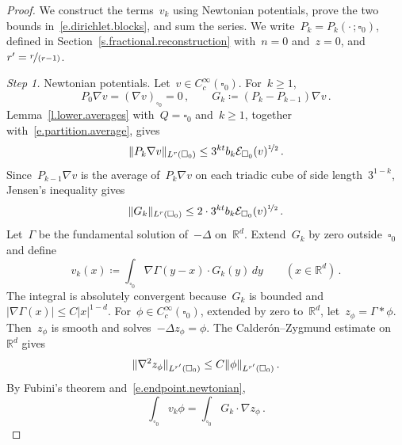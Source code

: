 \documentclass[11pt,letterpaper]{article}
\numberwithin{equation}{section}
\theoremstyle{definition}
\newcommand{\Rd}{\mathbb{R}^d}
\newcommand{\nf}{\nicefrac}
\newcommand{\cu}{\square}
\DeclarePairedDelimiter{\norm}{\lVert}{\rVert}
\newcommand{\Ener}{\mathcal E}
\begin{document}
\begin{proof}
We construct the terms~$v_k$ using Newtonian potentials, prove the two bounds in~\eqref{e.dirichlet.blocks}, and sum the series. We write~$P_k=P_k(\cdot\,;\cu_0)$, defined in Section~\ref{s.fractional.reconstruction} with~$n=0$ and~$z=0$, and~$r'=\nf r{(r-1)}$.

\smallskip

\emph{Step 1.} Newtonian potentials. Let~$v\in C^\infty_c(\cu_0)$. For~$k\geq1$,
\begin{equation*}
	P_0\nabla v=(\nabla v)_{\cu_0}=0\,,\qquad G_k\coloneqq(P_k-P_{k-1})\nabla v\,.
\end{equation*}
Lemma~\ref{l.lower.averages} with~$Q=\cu_0$ and~$k\geq1$, together with~\eqref{e.partition.average}, gives
\begin{equation*}
	\norm{P_k\nabla v}_{L^r(\cu_0)}\leq3^{kt}b_k\Ener_{\cu_0}(v)^{\nf12}\,.
\end{equation*}
Since~$P_{k-1}\nabla v$ is the average of~$P_k\nabla v$ on each triadic cube of side length~$3^{1-k}$, Jensen's inequality gives
\begin{equation}
	\norm{G_k}_{L^r(\cu_0)}\leq2\cdot3^{kt}b_k\Ener_{\cu_0}(v)^{\nf12}\,.
	\label{e.endpoint.gradient.increments}
\end{equation}
Let~$\Gamma$ be the fundamental solution of~$-\Delta$ on~$\Rd$. Extend~$G_k$ by zero outside~$\cu_0$ and define
\begin{equation}
	v_k(x)\coloneqq\int_{\cu_0}\nabla\Gamma(y-x)\cdot G_k(y)\,dy\qquad(x\in\Rd)\,.
	\label{e.endpoint.newtonian}
\end{equation}
The integral is absolutely convergent because~$G_k$ is bounded and~$|\nabla\Gamma(x)|\leq C|x|^{1-d}$. For~$\phi\in C^\infty_c(\cu_0)$, extended by zero to~$\Rd$, let~$z_\phi=\Gamma*\phi$. Then~$z_\phi$ is smooth and solves~$-\Delta z_\phi=\phi$. The Calder\'on--Zygmund estimate on~$\Rd$ gives
\begin{equation}
	\norm{\nabla^2z_\phi}_{L^{r'}(\cu_0)}\leq C\norm{\phi}_{L^{r'}(\cu_0)}\,.
	\label{e.dirichlet.estimates}
\end{equation}
By Fubini's theorem and~\eqref{e.endpoint.newtonian},
\begin{equation}
	\int_{\cu_0}v_k\phi=\int_{\cu_0}G_k\cdot\nabla z_\phi\,.
	\label{e.dirichlet.duality}
\end{equation}

\smallskip


\end{proof}
\end{document}
